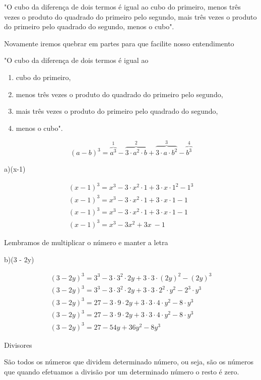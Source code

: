 \documentclass[letterpaper]{book}
\begin{document}
"O cubo da diferença de dois termos é igual ao cubo do primeiro, menos três vezes o produto do quadrado do primeiro pelo segundo, mais três vezes o produto do primeiro pelo quadrado do segundo, menos o cubo".

Novamente iremos quebrar em partes para que facilite nosso entendimento

"O cubo da diferença de dois termos é igual ao 
\begin{enumerate}
\item cubo do primeiro, 
\item menos três vezes o produto do quadrado do primeiro pelo segundo,
\item mais três vezes o produto do primeiro pelo quadrado do segundo,
\item menos o cubo".
\end{enumerate}

\[(a-b)^{3} = \overbrace{a^{3}}^{1} - \overbrace{3 \cdot a^{2} \cdot b}^{2} + \overbrace{3 \cdot a \cdot b^{2}}^{3} - \overbrace{b^{3}}^{4}\]

a)(x-1)

\begin{align}
(x-1)^{3} = x^{3} - 3 \cdot x^{2} \cdot 1 + 3 \cdot x \cdot 1^{2} - 1^{3}
\\
(x-1)^{3} = x^{3} - 3 \cdot x^{2} \cdot 1 + 3 \cdot x \cdot 1 - 1 
\\
(x-1)^{3} = x^{3} - 3 \cdot x^{2} \cdot 1 + 3 \cdot x \cdot 1 - 1 
\\
(x-1)^{3} = x^{3} - 3x^{2} + 3x \ - 1
\end{align}


Lembramos de multiplicar o número e manter a letra 

b)(3 - 2y)

\begin{align}
(3 - 2y)^{3} = 3^{3} - 3 \cdot 3^{2} \cdot 2y + 3 \cdot 3 \cdot (2y)^{2} - (2y)^{3}
\\
(3 - 2y)^{3} = 3^{3} - 3 \cdot 3^{2} \cdot 2y + 3 \cdot 3 \cdot 2^{2} \cdot y^{2} - 2^{3} \cdot y^{3}
\\
(3 - 2y)^{3} = 27 - 3 \cdot 9 \cdot 2y + 3 \cdot 3 \cdot 4 \cdot y^{2} - 8 \cdot y^{3}
\\
(3 - 2y)^{3} = 27 - 3 \cdot 9 \cdot 2y + 3 \cdot 3 \cdot 4 \cdot y^{2} - 8 \cdot y^{3} 
\\
(3 - 2y)^{3} = 27 - 54y + 36y^{2} - 8y^{3} 
\end{align}

Divisores

São todos os números que dividem determinado número, ou seja, são os números que quando efetuamos a divisão por um determinado número o resto é zero.
\end{document}
